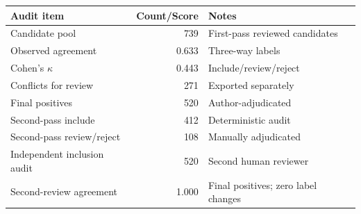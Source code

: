 \begin{tabular}{lrl}
\toprule
Audit item & Count/Score & Notes \\
\midrule
Candidate pool & 739 & First-pass reviewed candidates \\
Observed agreement & 0.633 & Three-way labels \\
Cohen's $\kappa$ & 0.443 & Include/review/reject \\
Conflicts for review & 271 & Exported separately \\
Final positives & 520 & Author-adjudicated \\
Second-pass include & 412 & Deterministic audit \\
Second-pass review/reject & 108 & Manually adjudicated \\
Independent inclusion audit & 520 & Second human reviewer \\
Second-review agreement & 1.000 & Final positives; zero label changes \\
\bottomrule
\end{tabular}
